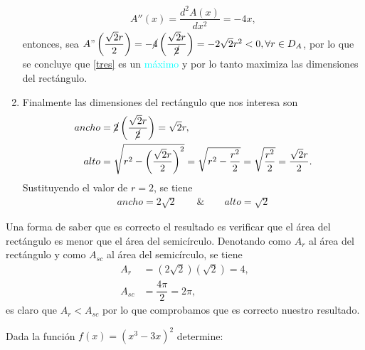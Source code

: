 \documentclass[legalpaper, 12pt]{exam}
\begin{document}
\begin{questions}
\begin{solution}
\begin{enumerate}
            \begin{align*}
            A''(x) = \dfrac{d^2A(x)}{dx^2} = -4x,
            \end{align*}
            entonces, sea $A"\left(\dfrac{\sqrt{2}r}{2}\right) = -\cancel{4}\left(\dfrac{\sqrt{2}r}{\cancel{2}}\right) = -2\sqrt{2}r^2 < 0,\forall r\in D_A$, por lo que se concluye que \eqref{tres} es un \textcolor{cyan}{máximo} y por lo tanto maximiza las dimensiones del rectángulo.
    \item Finalmente las dimensiones del rectángulo que nos interesa son
            \begin{align}
            ancho &= \cancel{2}\left(\dfrac{\sqrt{2}r}{\cancel{2}}\right) = \sqrt{2}r,\\
            alto &= \sqrt{r^2 - \left(\dfrac{\sqrt{2}r}{2}\right)^2} = \sqrt{r^2 - \dfrac{r^2}{2}} = \sqrt{\dfrac{r^2}{2}} = \dfrac{\sqrt{2}r}{2}.
            \end{align}
            Sustituyendo el valor de $r = 2$, se tiene
            \begin{align}
            ancho = 2\sqrt{2}\qquad\&\qquad alto = \sqrt{2}
            \end{align}
\end{enumerate}
\begin{center}
\end{center}
Una forma de saber que es correcto el resultado es verificar que el área del rectángulo es menor que el área del semicírculo. Denotando como $A_r$ al área del rectángulo y como $A_{sc}$ al área del semicírculo, se tiene
\begin{align*}
A_r &= \left(2\sqrt{2}\right)\left(\sqrt{2}\right) = 4,\\
A_{sc} &= \dfrac{4\pi}{2} = 2\pi,
\end{align*}
es claro que $A_r < A_{sc}$ por lo que comprobamos que es correcto nuestro resultado.
\end{solution}
 \vspace{0.15in}
\question Dada la función $f(x) = \left(x^3 - 3x\right)^2$ determine:
    \begin{parts}

\end{parts}
\end{questions}
\end{document}
